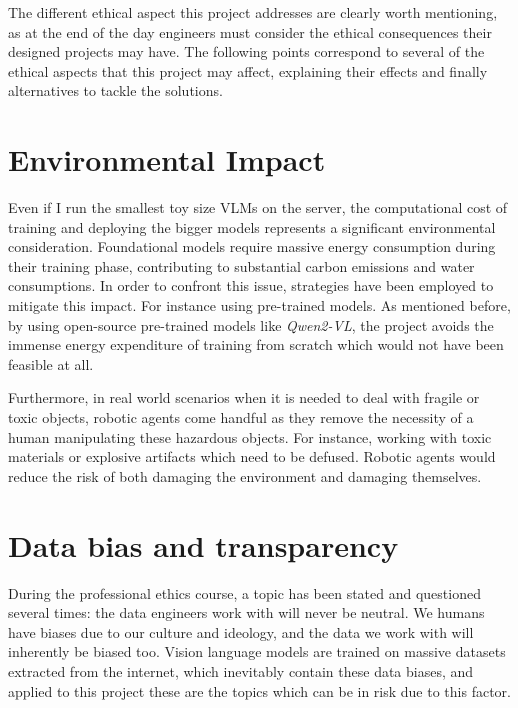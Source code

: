 The different ethical aspect this project addresses are clearly worth mentioning, as at the end of the day engineers must consider the ethical consequences their designed projects may have. The following points correspond to several of the ethical aspects that this project may affect, explaining their effects and finally alternatives to tackle the solutions. 

\section{Environmental Impact}
Even if I run the smallest toy size VLMs on the server, the computational cost of training and deploying  the bigger models represents a significant environmental consideration. Foundational models require massive energy consumption during their training phase, contributing to substantial carbon emissions and water consumptions. In order to confront this issue, strategies have been employed to mitigate this impact. For instance using pre-trained models. As mentioned before, by using open-source pre-trained models like \textit{Qwen2-VL}, the project avoids the immense energy expenditure of training from scratch which would not have been feasible at all. 

Furthermore, in real world scenarios when it is needed to deal with fragile or toxic objects, robotic agents come handful as they remove the necessity of a human manipulating these hazardous objects. For instance, working with toxic materials or explosive artifacts which need to be defused. Robotic agents would reduce the risk of both damaging the environment and damaging themselves. 

\section{Data bias and transparency}
During the professional ethics course, a topic has been stated and questioned several times: the data engineers work with will never be neutral. We humans have biases due to our culture and ideology, and the data we work with will inherently be biased too. Vision language models are trained on massive datasets extracted from the internet, which inevitably contain these data biases, and applied to this project these are the topics which can be in risk due to this factor. 

